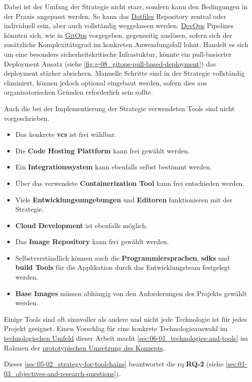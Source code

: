 Dabei ist der Umfang der Strategie nicht starr, sondern kann den Bedingungen in der Praxis angepasst werden. So kann das \hyperref[sec:03-04_idea-of-dotfiles]{Dotfiles} Repository zentral oder individuell sein, aber auch vollständig weggelassen werden. \hyperref[sec:03-01_introduction-to-devops]{DevOps} Pipelines könnten sich, wie in \hyperref[sec:03-03_gitops-as-further-evolution]{GitOps} vorgegeben, gegenseitig auslösen, sofern sich der zusätzliche Komplexitätsgrad im konkreten Anwendungsfall lohnt. Handelt es sich um eine besonders sicherheitskritische Infrastuktur, könnte ein pull-basierter Deployment Ansatz (siehe \autoref{fig:g-08_gitops-pull-based-deployment}) das \Gls{deployment} stärker absichern. Manuelle Schritte sind in der Strategie vollständig eliminiert, können jedoch optional eingebaut werden, sofern dies aus organisatorischen Gründen erforderlich sein sollte.

Auch die bei der Implementierung der Strategie verwendeten Tools sind nicht vorgeschrieben.

\begin{itemize}
    \item Das konkrete \textbf{\Gls{vcs}} ist frei wählbar.
    \item Die \textbf{Code Hosting Plattform} kann frei gewählt werden.
    \item Ein \textbf{Integrationssystem} kann ebenfalls selbst bestimmt werden.
    \item Über das verwendete \textbf{Containerization Tool} kann frei entschieden werden.
    \item Viele \textbf{Entwicklungsumgebungen} und \textbf{Editoren} funktionieren mit der Strategie.
    \item \textbf{Cloud Development} ist ebenfalls möglich.
    \item Das \textbf{Image Repository} kann frei gewählt werden.
    \item Selbstverständlich können auch die \textbf{Programmiersprachen}, \textbf{\Glspl{sdk}} und \textbf{\Gls{build} Tools} für die Applikation durch das Entwicklungsteam festgelegt werden.
    \item \textbf{Base Images} müssen abhängig von den Anforderungen des Projekts gewählt werden.
\end{itemize}

Einige Tools sind oft sinnvoller als andere und nicht jede Technologie ist für jedes Projekt geeignet. Einen Vorschlag für eine konkrete Technologieauswahl im \hyperref[ch:02_technological-environment]{technologischen Umfeld} dieser Arbeit macht \autoref{sec:06-01_technologies-and-tools} im Rahmen der \hyperref[ch:06_prototypical-implementation-of-the-concept]{prototypischen Umsetzung des Konzepts}.

Dieser \autoref{sec:05-02_strategy-for-toolchains} beantwortet die \acrlong{rq} \textbf{RQ-2} (siehe \autoref{sec:01-03_objectives-and-research-questions}).
